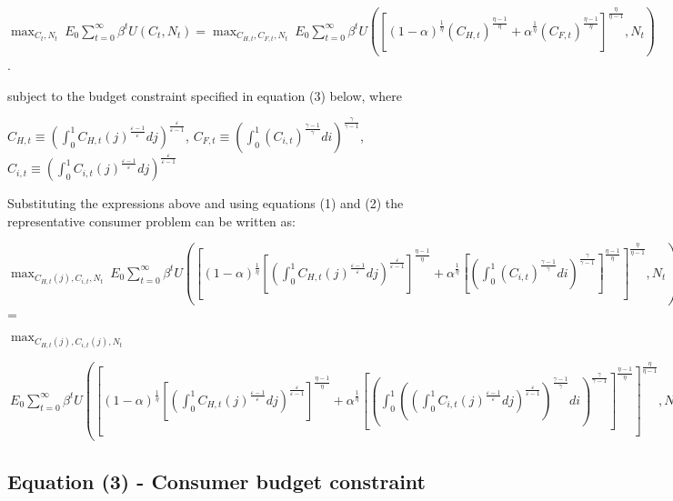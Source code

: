 \documentclass[
]{article}
\begin{document}
\(\displaystyle \max_{C_t,N_t} \ E_0 \sum_{t=0}^\infty \beta^tU(C_t,N_t) = \max_{C_{H,t},C_{F,t},N_t} \ E_0 \sum_{t=0}^\infty \beta^tU \left(\left[ (1-\alpha)^{\frac{1}{\eta}} (C_{H,t})^{\frac{\eta-1}{\eta}} + \alpha^{\frac{1}{\eta}} (C_{F,t})^{\frac{\eta-1}{\eta}} \right]^{\frac{\eta}{\eta-1}},N_t \right)\).

subject to the budget constraint specified in equation (3) below, where

\(C_{H,t} \equiv \displaystyle \left( \int_0^1 C_{H,t}(j)^{\frac{\varepsilon-1}{\varepsilon}}dj \right) ^{\frac{\varepsilon}{\varepsilon-1}}\),
\(C_{F,t} \equiv \displaystyle \left( \int_0^1 (C_{i,t})^{\frac{\gamma-1}{\gamma}}di \right) ^{\frac{\gamma}{\gamma-1}}\),
\(C_{i,t} \equiv \displaystyle \left( \int_0^1 C_{i,t}(j)^{\frac{\varepsilon-1}{\varepsilon}}dj \right) ^{\frac{\varepsilon}{\varepsilon-1}}\)

Substituting the expressions above and using equations (1) and (2) the
representative consumer problem can be written as:

\(\displaystyle \max_{C_{H,t}(j),C_{i,t},N_t} \ E_0 \sum_{t=0}^\infty \beta^tU \left(\left[ (1-\alpha)^{\frac{1}{\eta}} \left [\displaystyle \left( \int_0^1 C_{H,t}(j)^{\frac{\varepsilon-1}{\varepsilon}}dj \right) ^{\frac{\varepsilon}{\varepsilon-1}} \right]^{\frac{\eta-1}{\eta}} + \alpha^{\frac{1}{\eta}} \left[ \displaystyle \left( \int_0^1 (C_{i,t})^{\frac{\gamma-1}{\gamma}}di \right) ^{\frac{\gamma}{\gamma-1}} \right]^{\frac{\eta-1}{\eta}} \right]^{\frac{\eta}{\eta-1}},N_t \right)\)
=

\(\displaystyle \max_{C_{H,t}(j),C_{i,t}(j),N_t}\)

\(\ E_0 \sum_{t=0}^\infty \beta^tU \left(\left[ (1-\alpha)^{\frac{1}{\eta}} \left [\displaystyle \left( \int_0^1 C_{H,t}(j)^{\frac{\varepsilon-1}{\varepsilon}}dj \right) ^{\frac{\varepsilon}{\varepsilon-1}} \right]^{\frac{\eta-1}{\eta}} + \alpha^{\frac{1}{\eta}} \left[ \displaystyle \left( \int_0^1 \left( \displaystyle \left( \int_0^1 C_{i,t}(j)^{\frac{\varepsilon-1}{\varepsilon}}dj \right) ^{\frac{\varepsilon}{\varepsilon-1}} \right)^{\frac{\gamma-1}{\gamma}}di \right) ^{\frac{\gamma}{\gamma-1}} \right]^{\frac{\eta-1}{\eta}} \right]^{\frac{\eta}{\eta-1}},N_t \right)\)

\vspace{12pt}

\hypertarget{equation-3---consumer-budget-constraint}{%
\subsection{Equation (3) - Consumer budget
constraint}\label{equation-3---consumer-budget-constraint}}
\end{document}
